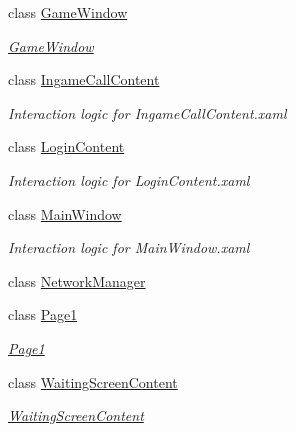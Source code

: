 \begin{DoxyCompactItemize}
class \hyperlink{class_client_1_1_game_window}{Game\+Window}
\begin{DoxyCompactList}\small\item\em \hyperlink{class_client_1_1_game_window}{Game\+Window} \end{DoxyCompactList}\item 
class \hyperlink{class_client_1_1_ingame_call_content}{Ingame\+Call\+Content}
\begin{DoxyCompactList}\small\item\em Interaction logic for Ingame\+Call\+Content.\+xaml \end{DoxyCompactList}\item 
class \hyperlink{class_client_1_1_login_content}{Login\+Content}
\begin{DoxyCompactList}\small\item\em Interaction logic for Login\+Content.\+xaml \end{DoxyCompactList}\item 
class \hyperlink{class_client_1_1_main_window}{Main\+Window}
\begin{DoxyCompactList}\small\item\em Interaction logic for Main\+Window.\+xaml \end{DoxyCompactList}\item 
class \hyperlink{class_client_1_1_network_manager}{Network\+Manager}
\item 
class \hyperlink{class_client_1_1_page1}{Page1}
\begin{DoxyCompactList}\small\item\em \hyperlink{class_client_1_1_page1}{Page1} \end{DoxyCompactList}\item 
class \hyperlink{class_client_1_1_waiting_screen_content}{Waiting\+Screen\+Content}
\begin{DoxyCompactList}\small\item\em \hyperlink{class_client_1_1_waiting_screen_content}{Waiting\+Screen\+Content} \end{DoxyCompactList}\end{DoxyCompactItemize}
